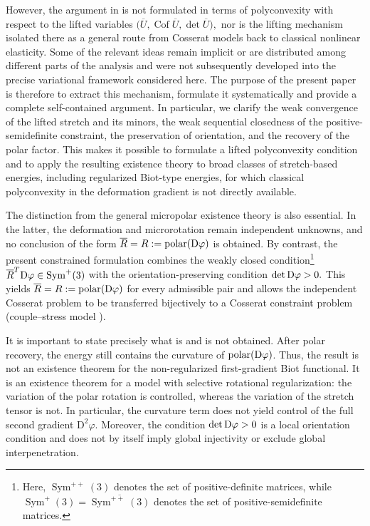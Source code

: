 \documentclass[11pt]{article}
\begin{document}
However, the argument in \cite{Neff_Habil04} is not formulated in terms of polyconvexity with respect to the lifted variables
$
\bigl(  \overline U ,\operatorname{Cof}  \overline U ,
\det  \overline U \bigr),
$
nor is the lifting mechanism isolated there as a general route from Cosserat models back to classical nonlinear elasticity. Some of the relevant ideas remain implicit or are distributed among different parts of the analysis and were not subsequently developed into the precise variational framework considered here.
The purpose of the present paper is therefore to extract this mechanism, formulate it systematically and provide a complete self-contained argument. In particular, we clarify the weak convergence of the lifted stretch and its minors, the weak sequential closedness of the positive-semidefinite constraint, the preservation of orientation, and the recovery of the polar factor. This makes it possible to formulate a lifted polyconvexity condition and to apply the resulting existence theory to broad classes of stretch-based energies, including regularized Biot-type energies, for which classical polyconvexity in the deformation gradient is not directly available.


The distinction from the general micropolar existence theory is also
essential. In the latter, the deformation and microrotation remain
independent unknowns, and no conclusion of the form
$
 \overline R=R:=\operatorname{polar}({\rm D}\varphi)
$
is obtained. By contrast, the present constrained formulation combines the
weakly closed condition\footnote{Here, $\operatorname{Sym}^{++}(3)$ denotes the set of positive-definite matrices, while $\operatorname{Sym}^{+}(3)=  \overline{\operatorname{Sym}^{++}(3)}$ denotes the set of positive-semidefinite matrices.}
$
 \overline R^T{\rm D}\varphi\in\operatorname{Sym}^{+}(3)
$
with the orientation-preserving condition
$
\det{\rm D}\varphi>0.
$
This yields $ \overline R=R:=\operatorname{polar}({\rm D}\varphi)$ for every admissible
pair and allows the independent Cosserat problem to be transferred
bijectively to a Cosserat constraint  problem (couple--stress model \cite{Toupin62,sky2026cosserat}).

It is important to state precisely what is and is not obtained. After polar recovery, the energy still contains the curvature of $\operatorname{polar}({\rm D}\varphi)$. Thus, the result is not an existence theorem for the non-regularized first-gradient Biot functional. It is an existence theorem for a model with selective rotational regularization: the variation of the polar rotation is controlled, whereas the variation of the stretch tensor is not. In particular, the curvature term does not yield control of the full second gradient $\mathrm D^2\varphi$. Moreover, the condition $\det{\rm D}\varphi>0$ is a local orientation condition and does not by itself imply global injectivity or exclude global interpenetration. 
\end{document}

